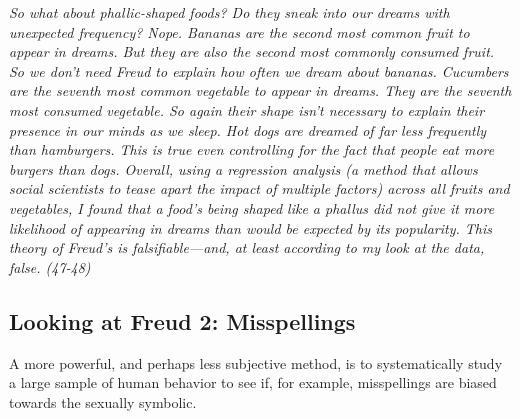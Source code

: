 \documentclass[]{book}
\theoremstyle{definition}
\theoremstyle{definition}
\theoremstyle{definition}
\theoremstyle{remark}
\begin{document}
\emph{So what about phallic-shaped foods? Do they sneak into our dreams
with unexpected frequency? Nope. Bananas are the second most common
fruit to appear in dreams. But they are also the second most commonly
consumed fruit. So we don't need Freud to explain how often we dream
about bananas. Cucumbers are the seventh most common vegetable to appear
in dreams. They are the seventh most consumed vegetable. So again their
shape isn't necessary to explain their presence in our minds as we
sleep. Hot dogs are dreamed of far less frequently than hamburgers. This
is true even controlling for the fact that people eat more burgers than
dogs. Overall, using a regression analysis (a method that allows social
scientists to tease apart the impact of multiple factors) across all
fruits and vegetables, I found that a food's being shaped like a phallus
did not give it more likelihood of appearing in dreams than would be
expected by its popularity. This theory of Freud's is falsifiable---and,
at least according to my look at the data, false. (47-48)}

\subsection{Looking at Freud 2:
Misspellings}\label{looking-at-freud-2-misspellings}

A more powerful, and perhaps less subjective method, is to
systematically study a large sample of human behavior to see if, for
example, misspellings are biased towards the sexually symbolic.
\end{document}
